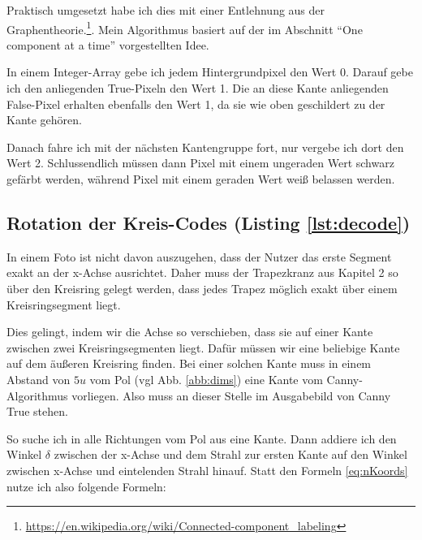 Praktisch umgesetzt habe ich dies mit einer Entlehnung aus der Graphentheorie.\footnote{\url{https://en.wikipedia.org/wiki/Connected-component_labeling}}. Mein Algorithmus basiert auf der im Abschnitt "`One component at a time"' vorgestellten Idee.

In einem Integer-Array gebe ich jedem Hintergrundpixel den Wert 0. Darauf gebe ich den anliegenden True-Pixeln den Wert 1. Die an diese Kante anliegenden False-Pixel erhalten ebenfalls den Wert 1, da sie wie oben geschildert zu der Kante gehören.

Danach fahre ich mit der nächsten Kantengruppe fort, nur vergebe ich dort den Wert 2. Schlussendlich müssen dann Pixel mit einem ungeraden Wert schwarz gefärbt werden, während Pixel mit einem geraden Wert weiß belassen werden.

\subsection {Rotation der Kreis-Codes (Listing \ref{lst:decode})}
In einem Foto ist nicht davon auszugehen, dass der Nutzer das erste Segment exakt an der x-Achse ausrichtet. Daher muss der Trapezkranz aus Kapitel 2 so über den Kreisring gelegt werden, dass jedes Trapez möglich exakt über einem Kreisringsegment liegt. 

Dies gelingt, indem wir die Achse so verschieben, dass sie auf einer Kante zwischen zwei Kreisringsegmenten liegt. Dafür müssen wir eine beliebige Kante auf dem äußeren Kreisring finden. Bei einer solchen Kante muss in einem Abstand von \(5u\) vom Pol (vgl Abb. \ref{abb:dims}) eine Kante vom Canny-Algorithmus vorliegen. Also muss an dieser Stelle im Ausgabebild von Canny True stehen.

So suche ich in alle Richtungen vom Pol aus eine Kante.
Dann addiere ich den Winkel \(\delta\) zwischen der x-Achse und dem Strahl zur ersten Kante auf den Winkel zwischen x-Achse und eintelenden Strahl hinauf. Statt den Formeln \ref{eq:nKoords} nutze ich also folgende Formeln:

